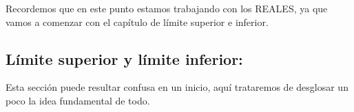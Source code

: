 \begin{itemize}[label={✎},leftmargin=*]
Recordemos que en este punto estamos trabajando con los REALES, ya que vamos a comenzar con el capítulo de límite superior e inferior.


\subsection{Límite superior y límite inferior:}

Esta sección puede resultar confusa en un inicio, aquí trataremos de desglosar un poco la idea fundamental de todo.

\begin{tikznt}
\centering
{} %

\begin{tikzpicture}[x=0.75pt,y=0.75pt,yscale=-1,xscale=1.5]


\end{tikzpicture}
\end{tikznt}
\end{itemize}
